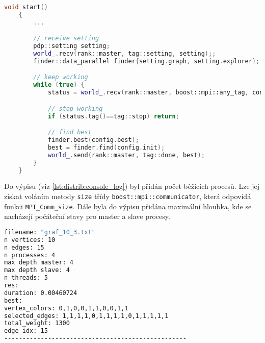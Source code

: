 \begin{lstlisting}[language=C++, label={lst:distrib:start}, title={Hlavní metoda třídy slave procesu}]
    void start()
    {
        ...

        // receive setting
        pdp::setting setting;
        world_.recv(rank::master, tag::setting, setting);;
        finder::data_parallel finder{setting.graph, setting.explorer};

        // keep working
        while (true) {
            status = world_.recv(rank::master, boost::mpi::any_tag, config);

            // stop working
            if (status.tag()==tag::stop) return;

            // find best
            finder.best(config.best);
            best = finder.find(config.init);
            world_.send(rank::master, tag::done, best);
        }
    }
\end{lstlisting}

Do výpisu (viz \ref{lst:distrib:console_log}) byl přidán počet běžících procesů.
Lze jej získat voláním metody \texttt{size} třídy \linebreak \texttt{boost::mpi::communicator}, která odpovídá funkci \texttt{MPI\_Comm\_size}.
Dále byla do výpisu přidána maximální hloubka, kde se nacházejí počáteční stavy pro master a slave procesy.

\begin{lstlisting}[language=bash, label={lst:distrib:console_log}, title={Příklad výpisu výsledků}]
filename: "graf_10_3.txt"
n vertices: 10
n edges: 15
n processes: 4
max depth master: 4
max depth slave: 4
n threads: 5
res:
duration: 0.00460724
best:
vertex_colors: 0,1,0,0,1,1,0,0,1,1
selected_edges: 1,1,1,1,0,1,1,1,1,0,1,1,1,1,1
total_weight: 1300
edge_idx: 15
--------------------------------------------------
\end{lstlisting}






